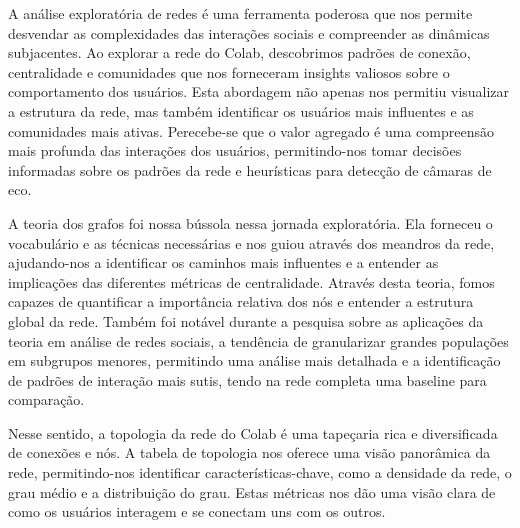 A análise exploratória de redes é uma ferramenta poderosa que nos permite desvendar as complexidades das interações sociais e compreender as dinâmicas subjacentes. Ao explorar a rede do Colab, descobrimos padrões de conexão, centralidade e comunidades que nos forneceram insights valiosos sobre o comportamento dos usuários. Esta abordagem não apenas nos permitiu visualizar a estrutura da rede, mas também identificar os usuários mais influentes e as comunidades mais ativas. Perecebe-se que o valor agregado é uma compreensão mais profunda das interações dos usuários, permitindo-nos tomar decisões informadas sobre os padrões da rede e heurísticas para detecção de câmaras de eco.

A teoria dos grafos foi nossa bússola nessa jornada exploratória. Ela forneceu o vocabulário e as técnicas necessárias e nos guiou através dos meandros da rede, ajudando-nos a identificar os caminhos mais influentes e a entender as implicações das diferentes métricas de centralidade. Através desta teoria, fomos capazes de quantificar a importância relativa dos nós e entender a estrutura global da rede. Também foi notável durante a pesquisa sobre as aplicações da teoria em análise de redes sociais, a tendência de granularizar grandes populações em subgrupos menores, permitindo uma análise mais detalhada e a identificação de padrões de interação mais sutis, tendo na rede completa uma baseline para comparação.

Nesse sentido, a topologia da rede do Colab é uma tapeçaria rica e diversificada de conexões e nós. A tabela de topologia nos oferece uma visão panorâmica da rede, permitindo-nos identificar características-chave, como a densidade da rede, o grau médio e a distribuição do grau. Estas métricas nos dão uma visão clara de como os usuários interagem e se conectam uns com os outros.

